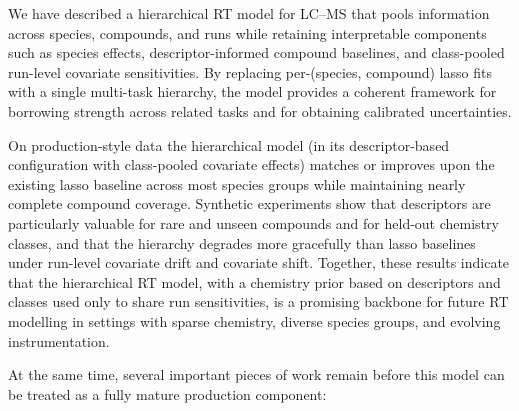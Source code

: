 \documentclass[11pt]{article}
\begin{document}
We have described a hierarchical RT model for LC--MS that pools information across
species, compounds, and runs while retaining interpretable components such as species
effects, descriptor-informed compound baselines, and class-pooled run-level covariate
sensitivities. By replacing per-(species, compound) lasso fits
with a single multi-task hierarchy, the model provides a coherent framework for
borrowing strength across related tasks and for obtaining calibrated uncertainties.

On production-style data the hierarchical model (in its descriptor-based configuration
with class-pooled covariate effects) matches or improves upon the existing lasso baseline across most
species groups while maintaining nearly complete compound coverage. Synthetic
experiments show that descriptors are particularly valuable for rare and unseen
compounds and for held-out chemistry classes, and that the hierarchy degrades more
gracefully than lasso baselines under run-level covariate drift and covariate shift.
Together, these results indicate that the hierarchical RT model, with a chemistry
prior based on descriptors and classes used only to share run sensitivities, is a promising backbone for
future RT modelling in settings with sparse chemistry, diverse species groups, and
evolving instrumentation.

At the same time, several important pieces of work remain before this model can be
treated as a fully mature production component:
\end{document}
